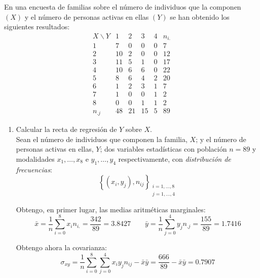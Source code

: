 \begin{ejercicio}\label{ej:2.Ejercicio3}
    En una encuesta de familias sobre el número de individuos que la componen $(X)$ y el número de personas activas en ellas $(Y)$ se han obtenido los siguientes resultados:
    \begin{equation*}
        \begin{array}{c|cccc|c}
            X\backslash Y & 1 & 2 & 3 & 4 & n_{i.} \\ \hline
            1 & 7 & 0 & 0 & 0 & 7\\
            2 & 10& 2 & 0 & 0 & 12\\
            3 & 11& 5 & 1 & 0 & 17\\
            4 & 10& 6 & 6 & 0 & 22\\
            5 & 8 & 6 & 4 & 2 & 20\\
            6 & 1 & 2 & 3 & 1 & 7\\
            7 & 1 & 0 & 0 & 1 & 2\\
            8 & 0 & 0 & 1 & 1 & 2\\ \hline
            n_{.j} & 48 & 21 & 15 & 5 & 89
        \end{array}
    \end{equation*}

    \begin{enumerate}
        \item Calcular la recta de regresión de $Y$ sobre $X$.\\
        Sean el número de individuos que componen la familia, $X$; y el número de personas activas en ellas, $Y$; dos variables estadísticas con población $n=89$ y modalidades $x_1, \dots, x_8$ e $y_1, \dots, y_4$ respectivamente, con \emph{distribución de frecuencias}:
        $$\left\{ (x_i,y_j), n_{ij}\right\}_{\substack{i=1,\dots,8\\j=1,\dots,4}}$$

        Obtengo, en primer lugar, las medias aritméticas marginales:
        \begin{equation*}
            \bar{x} = \frac{1}{n}\sum_{i=0}^8 x_in_{i.} = \frac{342}{89} = 3.8427
            \qquad
            \bar{y} = \frac{1}{n}\sum_{j=0}^4 y_jn_{.j} = \frac{155}{89} = 1.7416
        \end{equation*}
        
        Obtengo ahora la covarianza:
        \begin{equation*}
            \sigma_{xy} = \frac{1}{n}\sum_{i=0}^8 \sum_{j=0}^4 x_iy_jn_{ij} - \bar{x}\bar{y} = \frac{666}{89} - \bar{x}\bar{y} = 0.7907
        \end{equation*}


\end{enumerate}
\end{ejercicio}
